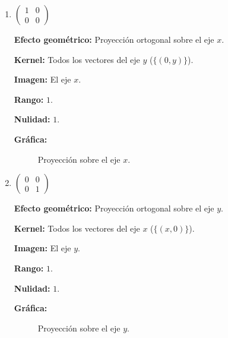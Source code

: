 \begin{prob}
\begin{enumerate}[$a)$]
    \item $\begin{pmatrix} 1 & 0 \\ 0 & 0 \end{pmatrix}$
    \begin{myproof}
    \textbf{Efecto geométrico:} Proyección ortogonal sobre el eje $x$.

    \textbf{Kernel:} Todos los vectores del eje $y$ ($\{(0,y)\}$).

    \textbf{Imagen:} El eje $x$.

    \textbf{Rango:} $1$.

    \textbf{Nulidad:} $1$.

    \textbf{Gráfica:}
    \begin{figure}[H]\centering
    \caption{Proyección sobre el eje $x$.}
    \end{figure}
    \end{myproof}
    
    \item $\begin{pmatrix} 0 & 0 \\ 0 & 1 \end{pmatrix}$
    \begin{myproof}
    \textbf{Efecto geométrico:} Proyección ortogonal sobre el eje $y$.

    \textbf{Kernel:} Todos los vectores del eje $x$ ($\{(x,0)\}$).

    \textbf{Imagen:} El eje $y$.

    \textbf{Rango:} $1$.

    \textbf{Nulidad:} $1$.

    \textbf{Gráfica:}
    \begin{figure}[H]\centering
    \caption{Proyección sobre el eje $y$.}
    \end{figure}
    \end{myproof}
    

\end{enumerate}
\end{prob}
